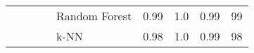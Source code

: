 \documentclass[sn-mathphys]{sn-jnl}%
\theoremstyle{thmstyleone}%
\theoremstyle{thmstyletwo}%
\theoremstyle{thmstylethree}%
\begin{document}
\begin{table*}[]
{\begin{tabular}{|l|l|c|c|l|c|c|c|c|}
                    &                          &                                                  &                                                                                                     
                    & Random Forest       & 0.99                                    & 1.0                                  & 0.99                                   & 99                                         \\ \cline{5-9} 
                    &                          &                                                  &                                         
                    & k-NN                & 0.98                                    & 1.0                                  & 0.99                                   & 98                                         \\ \hline
\end{tabular}}
\end{table*}
\end{document}
